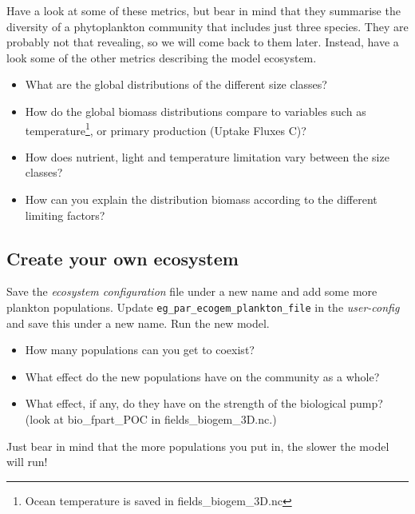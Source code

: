 \documentclass[11pt,fleqn]{book} %
\begin{document}
Have a look at some of these metrics, but bear in mind that they summarise the diversity of a phytoplankton community that includes just three species. They are probably not that revealing, so we will come back to them later. 
Instead, have a look some of the other metrics describing the model ecosystem.

\vspace{2mm} 
\begin{itemize}
\item What are the global distributions of the different size classes?
\item How do the global biomass distributions compare to variables such as temperature\footnote{Ocean temperature is saved in \textsf{\scriptsize fields\_biogem\_3D.nc}}, or primary production (\textsf{\small Uptake Fluxes C})?
\item How does nutrient, light and temperature limitation vary between the size classes?
\item How can you explain the distribution biomass according to the different limiting factors?
\end{itemize}
\vspace{2mm} 


\subsection{Create your own ecosystem} 

Save the \textit{ecosystem configuration} file under a new name and add some more plankton populations. Update \texttt{eg\_par\_ecogem\_plankton\_file} in the \textit{user-config} and save this under a new name.  Run the new model. 

\vspace{2mm} 
\begin{itemize}
\item How many populations can you get to coexist? 
\item What effect do the new populations have on the community as a whole? \item What effect, if any, do they have on the strength of the biological pump?\\(look at \textsf{\small bio\_fpart\_POC} in \textsf{\small fields\_biogem\_3D.nc}.)
\end{itemize}
\vspace{2mm} 

\noindent Just bear in mind that the more populations you put in, the slower the model will run!
\end{document}
